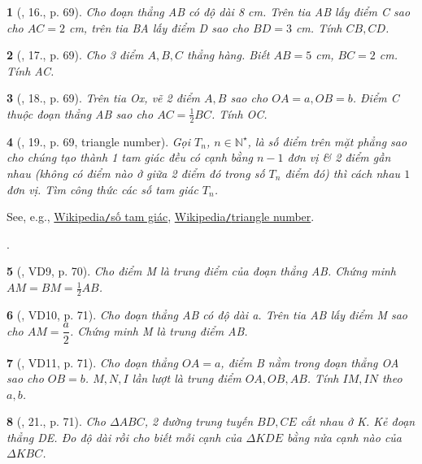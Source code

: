 \documentclass{article}
\newtheorem{baitoan}{}
\begin{document}
\begin{baitoan}[\cite{Binh_Toan_6_tap_2}, 16., p. 69]
	Cho đoạn thẳng AB có độ dài {\rm8 cm}. Trên tia AB lấy điểm C sao cho $AC = 2$ {\rm cm}, trên tia BA lấy điểm D sao cho $BD = 3$ {\rm cm}. Tính  $CB,CD$.
\end{baitoan}

\begin{baitoan}[\cite{Binh_Toan_6_tap_2}, 17., p. 69]
	Cho 3 điểm $A,B,C$ thẳng hàng. Biết $AB = 5$ {\rm cm}, $BC = 2$ {\rm cm}. Tính  AC.
\end{baitoan}

\begin{baitoan}[\cite{Binh_Toan_6_tap_2}, 18., p. 69]
	Trên tia Ox, vẽ 2 điểm $A,B$ sao cho $OA = a,OB = b$. Điểm C thuộc đoạn thẳng AB sao cho $AC = \frac{1}{2}BC$. Tính  OC.
\end{baitoan}

\begin{baitoan}[\cite{Binh_Toan_6_tap_2}, 19., p. 69, triangle number]
	Gọi $T_n$, $n\in\mathbb{N}^\star$, là số điểm trên mặt phẳng sao cho chúng tạo thành 1 tam giác đều có cạnh bằng $n - 1$ đơn vị \& 2 điểm gần nhau (không có điểm nào ở giữa 2 điểm đó trong số $T_n$ điểm đó) thì cách nhau $1$ đơn vị. Tìm công thức các số tam giác $T_n$.
\end{baitoan}
See, e.g., \href{https://vi.wikipedia.org/wiki/S%E1%BB%91_tam_gi%C3%A1c}{Wikipedia{\tt/}số tam giác}, \href{https://en.wikipedia.org/wiki/Triangular_number}{Wikipedia{\tt/}triangle number}.

\noindent\cite[20., p. 70]{Binh_Toan_6_tap_2}.

\begin{baitoan}[\cite{Binh_Toan_6_tap_2}, VD9, p. 70]
	Cho điểm M là trung điểm của đoạn thẳng AB. Chứng minh $AM = BM = \frac{1}{2}AB$.
\end{baitoan}

\begin{baitoan}[\cite{Binh_Toan_6_tap_2}, VD10, p. 71]
	Cho đoạn thẳng AB có độ dài a. Trên tia AB lấy điểm M sao cho $AM = \dfrac{a}{2}$. Chứng minh M là trung điểm AB.
\end{baitoan}

\begin{baitoan}[\cite{Binh_Toan_6_tap_2}, VD11, p. 71]
	Cho đoạn thẳng $OA = a$, điểm B nằm trong đoạn thẳng OA sao cho $OB = b$. $M,N,I$ lần lượt là trung điểm $OA,OB,AB$. Tính  $IM,IN$ theo $a,b$.
\end{baitoan}

\begin{baitoan}[\cite{Binh_Toan_6_tap_2}, 21., p. 71]
	Cho $\Delta ABC$, 2 đường trung tuyến $BD,CE$ cắt nhau ở K. Kẻ đoạn thẳng DE. Đo độ dài rồi cho biết mỗi cạnh của $\Delta KDE$ bằng nửa cạnh nào của $\Delta KBC$.
\end{baitoan}
\end{document}
